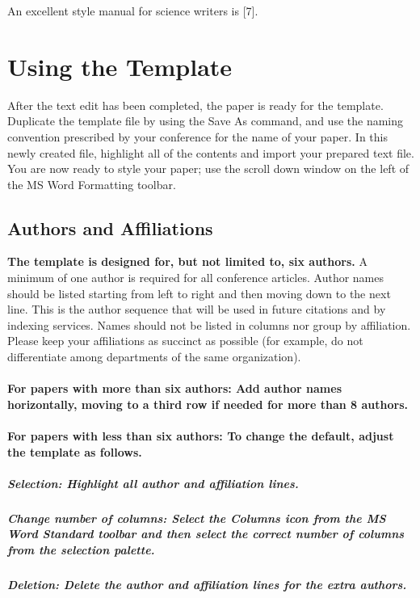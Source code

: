 \documentclass{article} %
\begin{document}
An excellent style manual for science writers is [7].


\section{ Using the Template}

After the text edit has been completed, the paper is ready for the template. Duplicate the template file by using the Save As command, and use the naming convention prescribed by your conference for the name of your paper. In this newly created file, highlight all of the contents and import your prepared text file. You are now ready to style your paper; use the scroll down window on the left of the MS Word Formatting toolbar.


\subsection{ Authors and Affiliations}

\textbf{The template is designed for, but not limited to, six authors.} A minimum of one author is required for all conference articles. Author names should be listed starting from left to right and then moving down to the next line. This is the author sequence that will be used in future citations and by indexing services. Names should not be listed in columns nor group by affiliation. Please keep your affiliations as succinct as possible (for example, do not differentiate among departments of the same organization).


\paragraph{ For papers with more than six authors: Add author names horizontally, moving to a third row if needed for more than 8 authors.}


\paragraph{ For papers with less than six authors: To change the default, adjust the template as follows.}


\subparagraph{ Selection: Highlight all author and affiliation lines.}


\subparagraph{ Change number of columns: Select the Columns icon from the MS Word Standard toolbar and then select the correct number of columns from the selection palette.}


\subparagraph{ Deletion: Delete the author and affiliation lines for the extra authors.}
\end{document}
